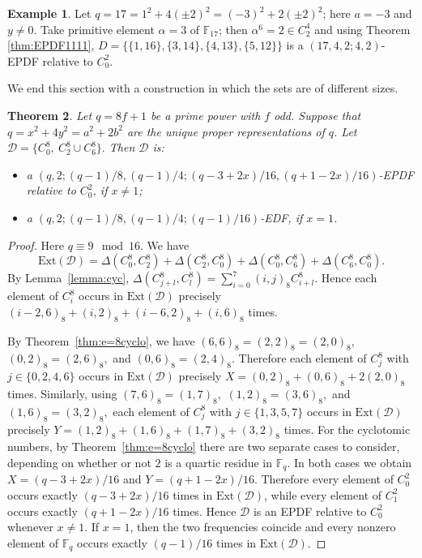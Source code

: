 \documentclass[12pt, a4paper]{article}
\newtheorem{theorem}{Theorem}[section]
\theoremstyle{definition}
\newtheorem{example}[theorem]{Example}
\begin{document}
\begin{example}
Let $q=17=1^2+4(\pm2)^2=(-3)^2+2(\pm 2)^2$; here $a=-3$ and $y \neq 0$.  Take primitive element $\alpha=3$ of $\mathbb{F}_{17}$; then $\alpha^6=2 \in C_2^4$ and using  Theorem \ref{thm:EPDF1111}, $D=\{ \{1,16\}, \{3,14\}, \{4,13\}, \{5,12\}\}$ is a $(17,4,2; 4,2)$-EPDF relative to $C_0^2$.
\end{example}

We end this section with a construction in which the sets are of different sizes.
\begin{theorem}\label{thm:EPDF026}
Let $q=8f+1$ be a prime power with $f$ odd. Suppose that
$q=x^2+4y^2=a^2+2b^2$ are the unique proper representations of $q$. Let
	$
	\mathcal D=\{C_0^8,\ C_2^8\cup C_6^8\}.
	$ 
	Then $\mathcal D$ is:
	\begin{itemize}
		\item a
		$(
		q,2;(q-1)/8,(q-1)/4;
		(q-3+2x)/16,
		(q+1-2x)/16
		)$-EPDF
		relative to $C_0^2$, if $x\ne1$;
		
		\item a
		$
	(q,2;(q-1)/8,(q-1)/4;
		(q-1)/16)$-EDF,
	if $x=1$.
	\end{itemize}
\end{theorem}
\begin{proof}
	Here $q \equiv 9 \mod 16$. 
	We have
	\[
	\mathrm{Ext}(\mathcal D)
	=
	\Delta(C_0^8,C_2^8)+\Delta(C_2^8,C_0^8)
	+\Delta(C_0^8,C_6^8)+\Delta(C_6^8,C_0^8).
	\]
	By Lemma~\ref{lemma:cyc},
	$
	\Delta(C_{j+l}^8,C_l^8)
	=
	\sum_{i=0}^7(i,j)_8C_{i+l}^8.
	$
	Hence each element of $C_i^8$ occurs in $\mathrm{Ext}(\mathcal D)$ precisely
	$
	(i-2,6)_8+(i,2)_8+(i-6,2)_8+(i,6)_8
	$ 
	times.
	
	 By
	Theorem~\ref{thm:e=8cyclo}, we have
	$
	(6,6)_8=(2,2)_8=(2,0)_8,
	$
	$
	(0,2)_8=(2,6)_8,
	$
	and
	$
	(0,6)_8=(2,4)_8.
	$
	Therefore each element of $C_j^8$ with $j\in\{0,2,4,6\}$ occurs in
	$\mathrm{Ext}(\mathcal D)$ precisely
	$
	X=(0,2)_8+(0,6)_8+2(2,0)_8
	$ 
	times. Similarly, using
	$
	(7,6)_8=(1,7)_8,
	$
	$
	(1,2)_8=(3,6)_8,
	$
	and
	$
	(1,6)_8=(3,2)_8,
	$
	each element of $C_j^8$ with $j\in\{1,3,5,7\}$ occurs in
	$\mathrm{Ext}(\mathcal D)$ precisely
	$
	Y=(1,2)_8+(1,6)_8+(1,7)_8+(3,2)_8
	$ 
	times. 	For the cyclotomic numbers, by Theorem~\ref{thm:e=8cyclo} there are two
	separate cases to consider, depending on whether or not $2$ is a quartic
	residue in $\mathbb F_q$. In both cases we obtain
	$
	X=(q-3+2x)/16
	$
	and
	$
	Y=(q+1-2x)/16.
	$
	Therefore every element of $C_0^2$ occurs exactly
	$
	(q-3+2x)/16
	$
	times in $\mathrm{Ext}(\mathcal D)$, while every element of $C_1^2$
	occurs exactly
	$
	(q+1-2x)/16
	$
	times. Hence $\mathcal D$ is an EPDF relative to $C_0^2$ whenever
	$x\ne1$. If $x=1$, then the two frequencies coincide and every nonzero element of
	$\mathbb F_q$ occurs exactly
	$
	(q-1)/16
	$
	times in $\mathrm{Ext}(\mathcal D)$.
\end{proof}
\end{document}
